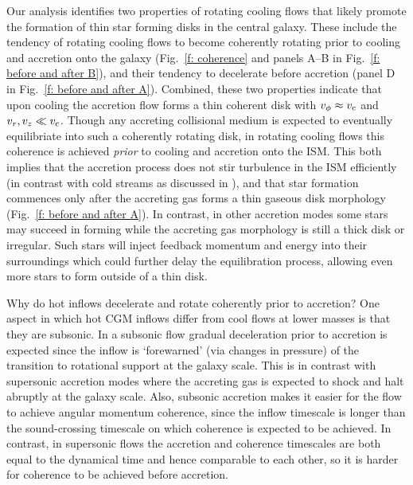 \documentclass[fleqn,usenatbib]{mnras}
\begin{document}
Our analysis identifies two properties of rotating cooling flows that likely promote the formation of thin star forming disks in the central galaxy.
These include the tendency of rotating cooling flows to become coherently rotating prior to cooling and accretion onto the galaxy (Fig.~\ref{f: coherence} and panels A--B in Fig.~\ref{f: before and after B}),
and their tendency to decelerate before accretion (panel D in Fig.~\ref{f: before and after A}).
Combined, these two properties indicate that upon cooling the accretion flow forms a thin coherent disk with $v_\phi\approx v_{\rm c}$ and $v_r, v_z \ll v_{\rm c}$. 
Though any accreting collisional medium is expected to eventually equilibriate into such a coherently rotating disk, in rotating cooling flows this coherence is achieved \textit{prior} to cooling and accretion onto the ISM.
This both implies that the accretion process does not stir turbulence in the ISM efficiently (in contrast with cold streams as discussed in \citealt{Dekel2009}), and that star formation commences only after the accreting gas forms a thin gaseous disk morphology (Fig.~\ref{f: before and after A}).
In contrast, in other accretion modes some stars may succeed in forming while the accreting gas morphology is still a thick disk or irregular.
Such stars will inject feedback momentum and energy into their surroundings which could further delay the equilibration process, allowing even more stars to form outside of a thin disk. 

Why do hot inflows decelerate and rotate coherently prior to accretion? One aspect in which hot CGM inflows differ from cool flows at lower masses is that they are subsonic. 
In a subsonic flow gradual deceleration prior to accretion is expected since the inflow is `forewarned' (via changes in pressure) of the transition to rotational support at the galaxy scale.
This is in contrast with supersonic accretion modes where the accreting gas is expected to shock and halt abruptly at the galaxy scale.
Also, subsonic accretion makes it easier for the flow to achieve angular momentum coherence, since the inflow timescale is longer than the sound-crossing timescale on which coherence is expected to be achieved. In contrast, in supersonic flows the accretion and coherence timescales are both equal to the dynamical time and hence comparable to each other, so it is harder for coherence to be achieved before accretion.
\end{document}

